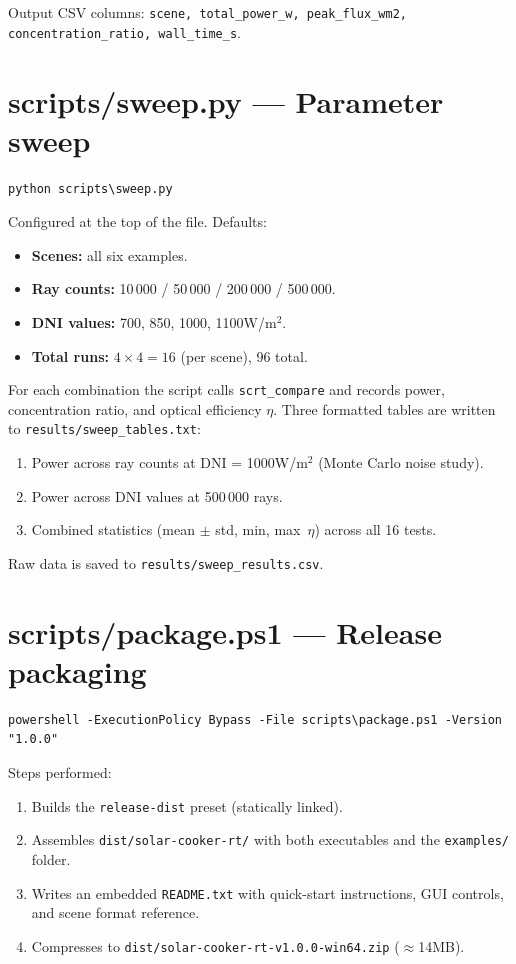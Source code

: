 \documentclass[12pt,a4paper]{report}
\begin{document}
Output CSV columns: \texttt{scene, total\_power\_w, peak\_flux\_wm2, concentration\_ratio,
wall\_time\_s}.

\section{scripts/sweep.py — Parameter sweep}

\begin{lstlisting}[style=shell]
python scripts\sweep.py
\end{lstlisting}

Configured at the top of the file.  Defaults:

\begin{itemize}
  \item \textbf{Scenes:} all six examples.
  \item \textbf{Ray counts:} 10\,000 / 50\,000 / 200\,000 / 500\,000.
  \item \textbf{DNI values:} 700, 850, 1000, 1100\;W/m$^2$.
  \item \textbf{Total runs:} $4 \times 4 = 16$ (per scene), 96 total.
\end{itemize}

For each combination the script calls \texttt{scrt\_compare} and records power, concentration
ratio, and optical efficiency $\eta$.  Three formatted tables are written to
\texttt{results/sweep\_tables.txt}:

\begin{enumerate}
  \item Power across ray counts at DNI = 1000\;W/m$^2$ (Monte Carlo noise study).
  \item Power across DNI values at 500\,000 rays.
  \item Combined statistics (mean $\pm$ std, min, max~$\eta$) across all 16 tests.
\end{enumerate}

Raw data is saved to \texttt{results/sweep\_results.csv}.

\section{scripts/package.ps1 — Release packaging}

\begin{lstlisting}[style=shell]
powershell -ExecutionPolicy Bypass -File scripts\package.ps1 -Version "1.0.0"
\end{lstlisting}

Steps performed:
\begin{enumerate}
  \item Builds the \texttt{release-dist} preset (statically linked).
  \item Assembles \texttt{dist/solar-cooker-rt/} with both executables and
        the \texttt{examples/} folder.
  \item Writes an embedded \texttt{README.txt} with quick-start instructions, GUI controls,
        and scene format reference.
  \item Compresses to \texttt{dist/solar-cooker-rt-v1.0.0-win64.zip} ($\approx$14\;MB).
\end{enumerate}
\end{document}
